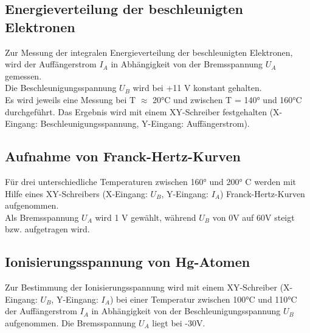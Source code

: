 \subsection{Energieverteilung der beschleunigten Elektronen}
Zur Messung der integralen Energieverteilung der beschleunigten Elektronen, wird der Auffängerstrom $I_A$ in Abhängigkeit von der Bremsspannung $U_A$ gemessen.\\
Die Beschleunigungsspannung $U_B$ wird bei +11 V konstant gehalten.\\ 
Es wird jeweils eine Messung bei T $\approx$ 20°C und zwischen T = 140° und 160°C durchgeführt. Das Ergebnis wird mit einem XY-Schreiber festgehalten (X-Eingang: Beschleunigungsspannung, Y-Eingang: Auffängerstrom).
\subsection{Aufnahme von Franck-Hertz-Kurven}
Für drei unterschiedliche Temperaturen zwischen 160° und 200° C werden mit Hilfe eines XY-Schreibers (X-Eingang: $U_B$, Y-Eingang: $I_A$) Franck-Hertz-Kurven aufgenommen.\\
Als Bremsspannung $U_A$ wird 1 V gewählt, während $U_B$ von 0V auf 60V steigt bzw. aufgetragen wird.
\subsection{Ionisierungsspannung von Hg-Atomen}
Zur Bestimmung der Ionisierungsspannung wird mit einem XY-Schreiber (X-Eingang: $U_B$, Y-Eingang: $I_A$) bei einer Temperatur zwischen 100°C und 110°C der Auffängerstrom $I_A$ in Abhängigkeit von der Beschleunigungsspannung $U_B$ aufgenommen. Die Bremsspannung $U_A$ liegt bei -30V.\\
